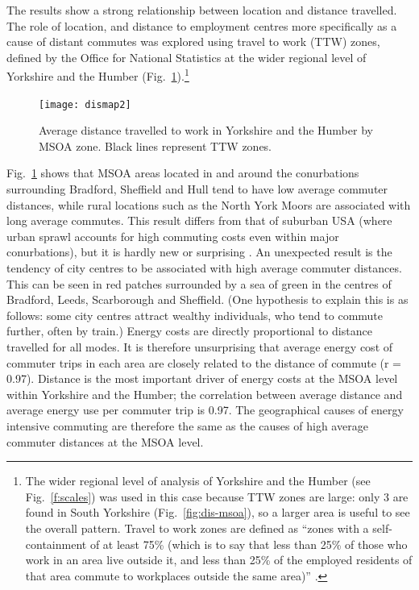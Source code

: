 The results show a strong relationship between location and
 distance travelled.
The role of location, and distance to employment centres
more specifically as a cause of distant
commutes was explored using travel to work (TTW) zones, defined by the Office
for National Statistics at the wider regional level of Yorkshire and the Humber
(Fig.~\ref{fig:map1}).\footnote{The
wider regional level of analysis of
Yorkshire and the Humber (see Fig.~\ref{f:scales}) was used in this case
because TTW zones are large: only 3 are found in South Yorkshire
(Fig.~\ref{fig:dis-msoa}), so a larger area is useful to see the overall
pattern. Travel to work zones are defined as ``zones with a self- containment of
at least 75\% (which is to say that less than 25\% of those who work in an area
live outside it, and less than 25\% of the employed residents of that area
commute to workplaces outside the same area)'' \citep{Coombes1982}.
}
\begin{figure}[h]
 \centering
 \texttt{[image: dismap2]}
 \caption[Average distance travelled to work in Yorkshire and the Humber]
 {Average distance travelled to work in Yorkshire and the Humber by MSOA
zone. Black lines represent TTW zones.}
 \label{fig:map1}
\end{figure}
Fig.~\ref{fig:map1} shows that MSOA areas located in and
around the conurbations surrounding Bradford, Sheffield and Hull tend to have
low average commuter distances, while rural locations such as the North
York Moors are associated with long average commutes. This result differs
from that of suburban USA (where urban sprawl accounts for high commuting costs
even within major conurbations), but it is hardly new or surprising
\citep{Marshall2008, Sexton2011}.
An unexpected result is the tendency of city centres to be associated
with high average commuter distances. This can be seen in red patches surrounded
by a sea of green in the centres of Bradford, Leeds, Scarborough and Sheffield.
(One hypothesis to explain this is as follows: some city centres attract
wealthy individuals, who tend to commute further, often by train.)
Energy costs are directly proportional to distance travelled for all
modes. It is therefore unsurprising that average energy cost of commuter trips in each area
are closely related to the distance of commute (r = 0.97).
Distance is the most important driver of energy costs at the MSOA level within
Yorkshire and the Humber; the correlation between average distance and average
energy use per commuter trip is 0.97.
The
geographical causes of energy intensive commuting are therefore the same as the
causes of high average commuter distances at the MSOA level.

